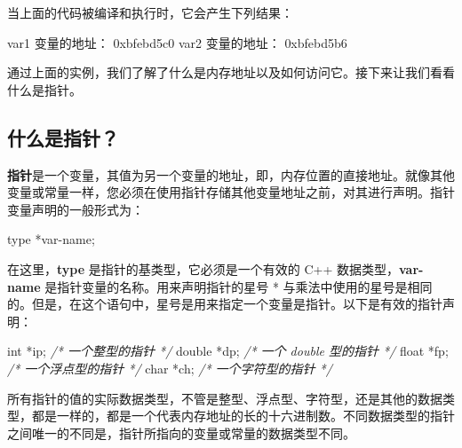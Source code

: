 \documentclass[
]{article}
\newenvironment{Shaded}{}{}
\newcommand{\BaseNTok}[1]{\textcolor[rgb]{0.25,0.63,0.44}{#1}}
\newcommand{\CommentTok}[1]{\textcolor[rgb]{0.38,0.63,0.69}{\textit{#1}}}
\newcommand{\DataTypeTok}[1]{\textcolor[rgb]{0.56,0.13,0.00}{#1}}
\newcommand{\NormalTok}[1]{#1}
\newcommand{\OperatorTok}[1]{\textcolor[rgb]{0.40,0.40,0.40}{#1}}
\begin{document}
当上面的代码被编译和执行时，它会产生下列结果：

\begin{Shaded}
\begin{Highlighting}[]
\NormalTok{var1 变量的地址： }\BaseNTok{0xbfebd5c0}
\NormalTok{var2 变量的地址： }\BaseNTok{0xbfebd5b6}
\end{Highlighting}
\end{Shaded}

通过上面的实例，我们了解了什么是内存地址以及如何访问它。接下来让我们看看什么是指针。

\hypertarget{ux4ec0ux4e48ux662fux6307ux9488}{%
\subsection{什么是指针？}\label{ux4ec0ux4e48ux662fux6307ux9488}}

\textbf{指针}是一个变量，其值为另一个变量的地址，即，内存位置的直接地址。就像其他变量或常量一样，您必须在使用指针存储其他变量地址之前，对其进行声明。指针变量声明的一般形式为：

\begin{Shaded}
\begin{Highlighting}[]
\NormalTok{type }\OperatorTok{*}\NormalTok{var}\OperatorTok{{-}}\NormalTok{name}\OperatorTok{;}
\end{Highlighting}
\end{Shaded}

在这里，\textbf{type} 是指针的基类型，它必须是一个有效的 C++
数据类型，\textbf{var-name} 是指针变量的名称。用来声明指针的星号 *
与乘法中使用的星号是相同的。但是，在这个语句中，星号是用来指定一个变量是指针。以下是有效的指针声明：

\begin{Shaded}
\begin{Highlighting}[]
\DataTypeTok{int}    \OperatorTok{*}\NormalTok{ip}\OperatorTok{;}    \CommentTok{/* 一个整型的指针 */}
\DataTypeTok{double} \OperatorTok{*}\NormalTok{dp}\OperatorTok{;}    \CommentTok{/* 一个 double 型的指针 */}
\DataTypeTok{float}  \OperatorTok{*}\NormalTok{fp}\OperatorTok{;}    \CommentTok{/* 一个浮点型的指针 */}
\DataTypeTok{char}   \OperatorTok{*}\NormalTok{ch}\OperatorTok{;}    \CommentTok{/* 一个字符型的指针 */}
\end{Highlighting}
\end{Shaded}

所有指针的值的实际数据类型，不管是整型、浮点型、字符型，还是其他的数据类型，都是一样的，都是一个代表内存地址的长的十六进制数。不同数据类型的指针之间唯一的不同是，指针所指向的变量或常量的数据类型不同。
\end{document}
